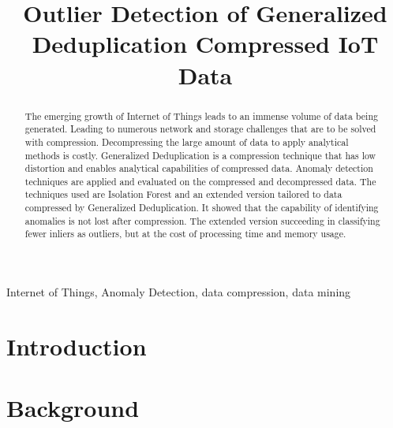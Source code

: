 \documentclass[conference]{IEEEtran}
\begin{document}
\title{Outlier Detection of Generalized Deduplication Compressed IoT Data\\
}

\author{
}

\maketitle
\thispagestyle{plain}
\pagestyle{plain}
\begin{abstract}
  The emerging growth of Internet of Things leads to an immense volume of data being generated. Leading to numerous network and storage challenges that are to be solved with compression. Decompressing the large amount of data to apply analytical methods is costly. Generalized Deduplication is a compression technique that has low distortion and enables analytical capabilities of compressed data. Anomaly detection techniques are applied and evaluated on the compressed and decompressed data. The techniques used are Isolation Forest and an extended version tailored to data compressed by Generalized Deduplication. It showed that the capability of identifying anomalies is not lost after compression. The extended version succeeding in classifying fewer inliers as outliers, but at the cost of processing time and memory usage.       
\end{abstract}

\begin{IEEEkeywords}
  Internet of Things, Anomaly Detection, data compression, data mining
\end{IEEEkeywords}

\section{Introduction}


\section{Background}\label{sec:background}

\end{document}
